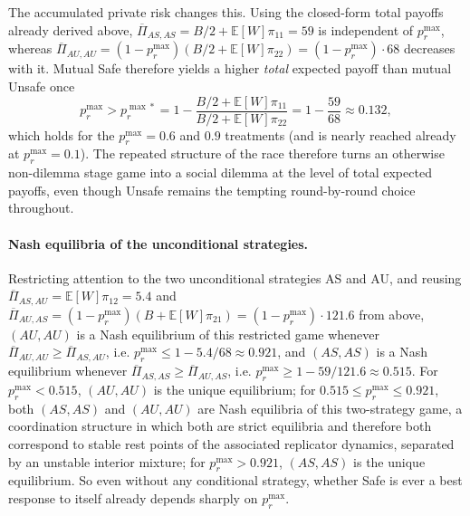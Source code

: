 \documentclass[pdflatex,sn-mathphys-ay]{sn-jnl}
\theoremstyle{thmstyleone}
\theoremstyle{thmstyletwo}
\theoremstyle{thmstylethree}
\begin{document}
The accumulated private risk changes this. Using the closed-form total payoffs already derived above, \(\overline{\Pi}_{AS,AS}=B/2+\mathbb{E}[W]\pi_{11}=59\) is independent of \(p_r^{\max}\), whereas \(\overline{\Pi}_{AU,AU}=(1-p_r^{\max})(B/2+\mathbb{E}[W]\pi_{22})=(1-p_r^{\max})\cdot68\) decreases with it. Mutual Safe therefore yields a higher \emph{total} expected payoff than mutual Unsafe once
\[
p_r^{\max} > p_r^{\max*} = 1-\frac{B/2+\mathbb{E}[W]\pi_{11}}{B/2+\mathbb{E}[W]\pi_{22}} = 1-\frac{59}{68}\approx0.132,
\]
which holds for the \(p_r^{\max}=0.6\) and \(0.9\) treatments (and is nearly reached already at \(p_r^{\max}=0.1\)). The repeated structure of the race therefore turns an otherwise non-dilemma stage game into a social dilemma at the level of total expected payoffs, even though Unsafe remains the tempting round-by-round choice throughout.

\paragraph{Nash equilibria of the unconditional strategies.} Restricting attention to the two unconditional strategies AS and AU, and reusing \(\overline{\Pi}_{AS,AU}=\mathbb{E}[W]\pi_{12}=5.4\) and \(\overline{\Pi}_{AU,AS}=(1-p_r^{\max})(B+\mathbb{E}[W]\pi_{21})=(1-p_r^{\max})\cdot121.6\) from above, \((AU,AU)\) is a Nash equilibrium of this restricted game whenever \(\overline{\Pi}_{AU,AU}\ge\overline{\Pi}_{AS,AU}\), i.e. \(p_r^{\max}\le1-5.4/68\approx0.921\), and \((AS,AS)\) is a Nash equilibrium whenever \(\overline{\Pi}_{AS,AS}\ge\overline{\Pi}_{AU,AS}\), i.e. \(p_r^{\max}\ge1-59/121.6\approx0.515\). For \(p_r^{\max}<0.515\), \((AU,AU)\) is the unique equilibrium; for \(0.515\le p_r^{\max}\le0.921\), both \((AS,AS)\) and \((AU,AU)\) are Nash equilibria of this two-strategy game, a coordination structure in which both are strict equilibria and therefore both correspond to stable rest points of the associated replicator dynamics, separated by an unstable interior mixture; for \(p_r^{\max}>0.921\), \((AS,AS)\) is the unique equilibrium. So even without any conditional strategy, whether Safe is ever a best response to itself already depends sharply on \(p_r^{\max}\).
\end{document}
